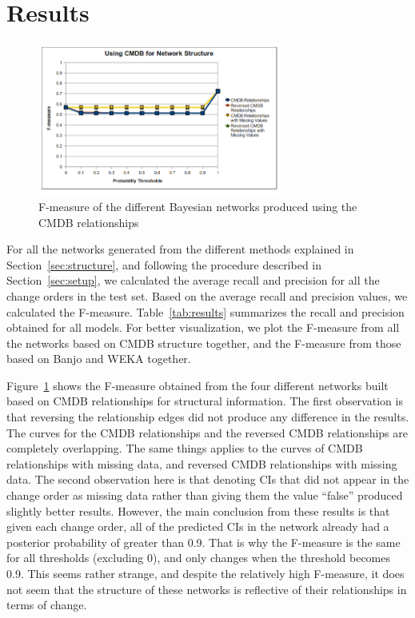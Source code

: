 \documentclass[10pt,twocolumn,letterpaper]{article}
\begin{document}
\section{Results}
\label{sec:results}

\begin{figure}[!t]
\centering
\includegraphics[width=8cm]{graphics/cmdbresults.png}
\caption{F-measure of the different Bayesian networks produced using the CMDB relationships}
\label{fig:cmdbresults}
\end{figure}

For all the networks generated from the different methods explained in Section~\ref{sec:structure}, and following the procedure described in
Section~\ref{sec:setup}, we calculated the average recall and precision for all the change orders in the test set. Based on the average recall and precision
values, we calculated the F-measure. Table~\ref{tab:results} summarizes the recall and precision obtained for all models. For better visualization, we plot the
F-measure from all the networks based on CMDB structure together, and the F-measure from those based on Banjo and WEKA together.

Figure~\ref{fig:cmdbresults} shows the F-measure obtained from the four different networks built based on CMDB relationships for structural information. The
first observation is that reversing the relationship edges did not produce any difference in the results. The curves for the CMDB relationships and the reversed
CMDB relationships are completely overlapping. The same things applies to the curves of CMDB relationships with missing data, and reversed CMDB relationships
with missing data. The second observation here is that denoting CIs that did not appear in the change order as missing data rather than giving them the value
``false'' produced slightly better results. However, the main conclusion from these results is that given each change order, all of the predicted CIs in the
network already had a posterior probability of greater than 0.9. That is why the F-measure is the same for all thresholds (excluding 0), and only
changes when the threshold becomes 0.9. This seems rather strange, and despite the relatively high F-measure, it does not seem that the structure
of these networks is reflective of their relationships in terms of change.
\end{document}
